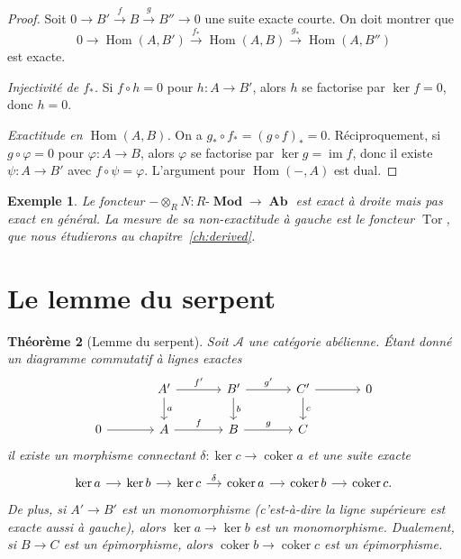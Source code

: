 \documentclass[a4paper,12pt]{book}
\DeclareMathOperator{\Hom}{Hom}
\DeclareMathOperator{\im}{im}
\DeclareMathOperator{\coker}{coker}
\DeclareMathOperator{\Ab}{\mathbf{Ab}}
\DeclareMathOperator{\Mod}{\mathbf{Mod}}
\newtheorem{theoreme}{Théorème}[chapter]
\newtheorem{exemple}[theoreme]{Exemple}
\begin{document}
\begin{proof}
Soit $0 \to B' \xrightarrow{f} B \xrightarrow{g} B'' \to 0$ une suite
exacte courte. On doit montrer que
\[
  0 \to \Hom(A, B') \xrightarrow{f_*} \Hom(A, B) \xrightarrow{g_*} \Hom(A, B'')
\]
est exacte.

\emph{Injectivité de $f_*$.}
Si $f \circ h = 0$ pour $h \colon A \to B'$, alors $h$ se factorise
par $\ker f = 0$, donc $h = 0$.

\emph{Exactitude en $\Hom(A, B)$.}
On a $g_* \circ f_* = (g \circ f)_* = 0$. Réciproquement, si
$g \circ \varphi = 0$ pour $\varphi \colon A \to B$, alors $\varphi$
se factorise par $\ker g = \im f$, donc il existe
$\psi \colon A \to B'$ avec $f \circ \psi = \varphi$.
L'argument pour $\Hom(-, A)$ est dual.
\end{proof}

\begin{exemple}\label{ex:tensor-right-exact}
Le foncteur $- \otimes_R N \colon R\text{-}\Mod \to \Ab$ est exact
à droite mais pas exact en général. La mesure de sa non-exactitude
à gauche est le foncteur $\operatorname{Tor}$,
que nous étudierons au chapitre~\ref{ch:derived}.
\end{exemple}


\section{Le lemme du serpent}\label{sec:snake-lemma}

\begin{theoreme}[Lemme du serpent]\label{thm:snake-lemma}
Soit $\mathcal{A}$ une catégorie abélienne. Étant donné un diagramme
commutatif à lignes exactes
\[
\begin{tikzcd}[column sep=large]
  & A' \arrow[r, "f'"] \arrow[d, "a"]
  & B' \arrow[r, "g'"] \arrow[d, "b"]
  & C' \arrow[r] \arrow[d, "c"]
  & 0 \\
0 \arrow[r]
  & A \arrow[r, "f"]
  & B \arrow[r, "g"]
  & C &
\end{tikzcd}
\]
il existe un morphisme connectant
$\delta \colon \ker c \to \coker a$ et une suite exacte
\[
\begin{tikzcd}[column sep=small]
\ker a \arrow[r] & \ker b \arrow[r] & \ker c
  \arrow[r, "\delta"] & \coker a \arrow[r] & \coker b \arrow[r] & \coker c.
\end{tikzcd}
\]
De plus, si $A' \to B'$ est un monomorphisme (c'est-à-dire la ligne supérieure
est exacte aussi à gauche), alors $\ker a \to \ker b$ est un
monomorphisme. Dualement, si $B \to C$ est un épimorphisme, alors
$\coker b \to \coker c$ est un épimorphisme.
\end{theoreme}
\end{document}

